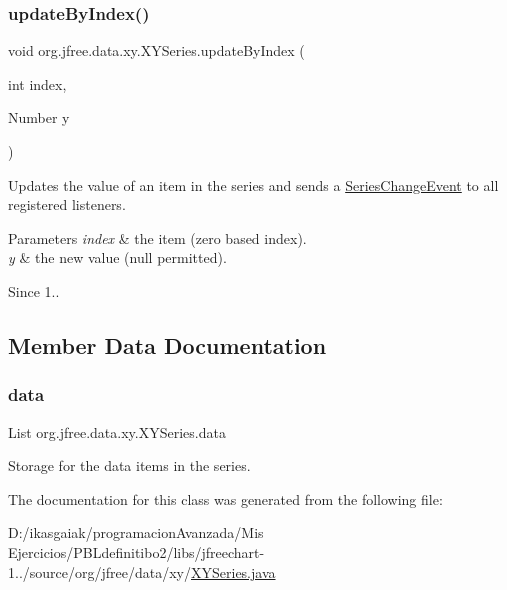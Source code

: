 \subsubsection{\texorpdfstring{update\+By\+Index()}{updateByIndex()}}
{\footnotesize\ttfamily void org.\+jfree.\+data.\+xy.\+X\+Y\+Series.\+update\+By\+Index (\begin{DoxyParamCaption}\item[{int}]{index,  }\item[{Number}]{y }\end{DoxyParamCaption})}

Updates the value of an item in the series and sends a \mbox{\hyperlink{}{Series\+Change\+Event}} to all registered listeners.


\begin{DoxyParams}{Parameters}
{\em index} & the item (zero based index). \\
\hline
{\em y} & the new value ({\ttfamily null} permitted).\\
\hline
\end{DoxyParams}
\begin{DoxySince}{Since}
1.. 
\end{DoxySince}


\subsection{Member Data Documentation}
\mbox{\label{classorg_1_1jfree_1_1data_1_1xy_1_1_x_y_series_aef5cd75ab29fa8abc27441a7bc7d1cf9}} 
\subsubsection{\texorpdfstring{data}{data}}
{\footnotesize\ttfamily List org.\+jfree.\+data.\+xy.\+X\+Y\+Series.\+data\hspace{0.3cm}{\ttfamily [protected]}}

Storage for the data items in the series. 

The documentation for this class was generated from the following file\+:\begin{DoxyCompactItemize}
\item 
D\+:/ikasgaiak/programacion\+Avanzada/\+Mis Ejercicios/\+P\+B\+Ldefinitibo2/libs/jfreechart-\/1../source/org/jfree/data/xy/\mbox{\hyperlink{_x_y_series_8java}{X\+Y\+Series.\+java}}\end{DoxyCompactItemize}
